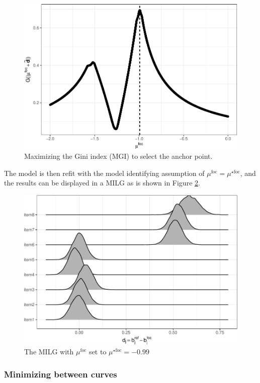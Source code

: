 \documentclass[
  11pt,
]{article}
\begin{document}
\begin{figure}[H]

{\centering \includegraphics[width=0.7\linewidth]{paper_files/figure-latex/ginipath-1} 

}

\caption{Maximizing the Gini index (MGI) to select the anchor point.}\label{fig:ginipath}
\end{figure}

The model is then refit with the model identifying assumption of \(\mu^{\text{foc}} = \mu^{\star\text{foc}}\), and the results can be displayed in a MILG as is shown in Figure \ref{fig:ginimilg}.

\begin{figure}[H]

{\centering \includegraphics[width=0.7\linewidth]{paper_files/figure-latex/ginimilg-1} 

}

\caption{The MILG with $\mu^{\text{foc}}$ set to $\mu^{\star\text{foc}} = -0.99$}\label{fig:ginimilg}
\end{figure}

\hypertarget{minimizing-between-curves}{%
\subsubsection{Minimizing between curves}\label{minimizing-between-curves}}
\end{document}
